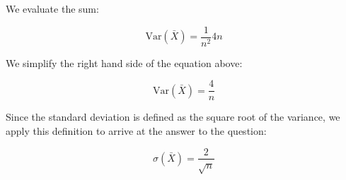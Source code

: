 \documentclass[a4paper,11pt]{article}
\begin{document}
We evaluate the sum:

\begin{equation}
\text{Var}\left( \bar{X} \right)
  = \frac{1}{n^{2}} 4n
\end{equation}

We simplify the right hand side of the equation above:

\begin{equation}
\text{Var}\left( \bar{X} \right)
  =  \frac{4}{n}
\end{equation}

Since the standard deviation is defined as the square root of the variance, we
apply this definition to arrive at the answer to the question:

\begin{equation}
\sigma \left( \bar{X} \right)
  =  \frac{2}{\sqrt{n}}
\end{equation}

\printbibliography{}
\end{document}
